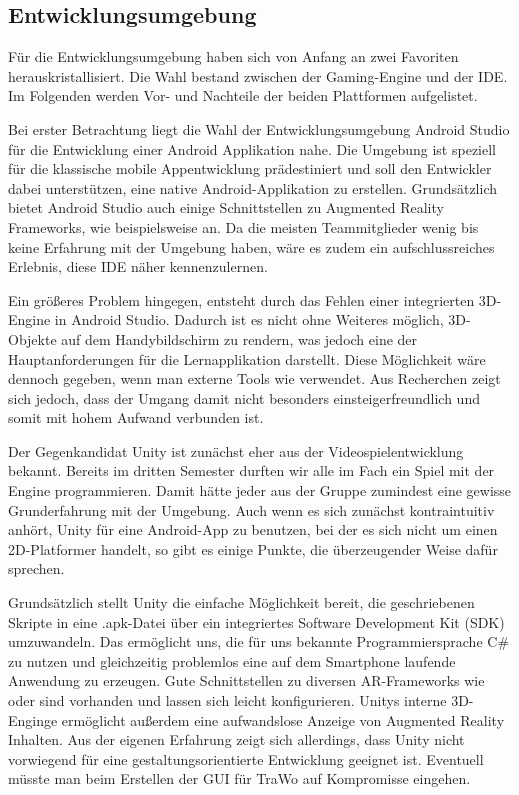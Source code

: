 \subsection{Entwicklungsumgebung}\label{entwicklungsumgebung}
Für die Entwicklungsumgebung haben sich von Anfang an zwei Favoriten herauskristallisiert. Die Wahl bestand zwischen der Gaming-Engine  und der  IDE. Im Folgenden werden Vor- und Nachteile der beiden Plattformen aufgelistet.

Bei erster Betrachtung liegt die Wahl der Entwicklungsumgebung Android Studio für die Entwicklung einer Android Applikation nahe. Die Umgebung ist speziell für die klassische mobile Appentwicklung prädestiniert und soll den Entwickler dabei unterstützen, eine native Android-Applikation zu erstellen. Grundsätzlich bietet Android Studio auch einige Schnittstellen zu Augmented Reality Frameworks, wie beispielsweise  an. Da die meisten Teammitglieder wenig bis keine Erfahrung mit der Umgebung haben, wäre es zudem ein aufschlussreiches Erlebnis, diese IDE näher kennenzulernen.

Ein größeres Problem hingegen, entsteht durch das Fehlen einer integrierten 3D-Engine in Android Studio. Dadurch ist es nicht ohne Weiteres möglich, 3D-Objekte auf dem Handybildschirm zu rendern, was jedoch eine der Hauptanforderungen für die Lernapplikation darstellt. Diese Möglichkeit wäre dennoch gegeben, wenn man externe Tools wie  verwendet. Aus Recherchen zeigt sich jedoch, dass der Umgang damit nicht besonders einsteigerfreundlich und somit mit hohem Aufwand verbunden ist.

Der Gegenkandidat Unity ist zunächst eher aus der Videospielentwicklung bekannt. Bereits im dritten Semester durften wir alle im Fach  ein Spiel mit der Engine programmieren. Damit hätte jeder aus der Gruppe zumindest eine gewisse Grunderfahrung mit der Umgebung. Auch wenn es sich zunächst kontraintuitiv anhört, Unity für eine Android-App zu benutzen, bei der es sich nicht um einen 2D-Platformer handelt, so gibt es einige Punkte, die überzeugender Weise dafür sprechen.

Grundsätzlich stellt Unity die einfache Möglichkeit bereit, die geschriebenen Skripte in eine .apk-Datei über ein integriertes Software Development Kit (SDK) umzuwandeln. Das ermöglicht uns, die für uns bekannte Programmiersprache C\# zu nutzen und gleichzeitig problemlos eine auf dem Smartphone laufende Anwendung zu erzeugen. Gute Schnittstellen zu diversen AR-Frameworks wie  oder  sind vorhanden und lassen sich leicht konfigurieren. Unitys interne 3D-Enginge ermöglicht außerdem eine aufwandslose Anzeige von Augmented Reality Inhalten. Aus der eigenen Erfahrung zeigt sich allerdings, dass Unity nicht vorwiegend für eine gestaltungsorientierte Entwicklung geeignet ist. Eventuell müsste man beim Erstellen der GUI für TraWo auf Kompromisse eingehen.

